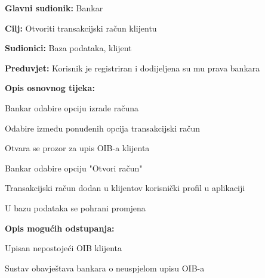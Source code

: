                \noindent {}
                \begin{packed_item}
            
                  \item \textbf{Glavni sudionik: }Bankar
                  \item  \textbf{Cilj:} Otvoriti transakcijski račun klijentu
                  \item  \textbf{Sudionici:} Baza podataka, klijent
                  \item  \textbf{Preduvjet:} Korisnik je registriran i dodijeljena su mu prava bankara
                  \item  \textbf{Opis osnovnog tijeka:}
                  
                  \item[] \begin{packed_enum}
                
                    \item Bankar odabire opciju izrade računa 
                    \item Odabire između ponuđenih opcija transakcijski račun
                    \item Otvara se prozor za upis OIB-a klijenta 
                    \item Bankar odabire opciju "Otvori račun"
                    \item Transakcijski račun dodan u klijentov korisnički profil u aplikaciji
                    \item U bazu podataka se pohrani promjena 
                  \end{packed_enum}
                  
                  \item  \textbf{Opis mogućih odstupanja:}
                  
                  \item[] \begin{packed_item}
                
                    \item[3.a] Upisan nepostojeći OIB klijenta
                    \item[] \begin{packed_enum}
                      
                      \item Sustav obavještava bankara o neuspjelom upisu OIB-a 
                      
                    \end{packed_enum}
                    
                  \end{packed_item}
                \end{packed_item}
                
